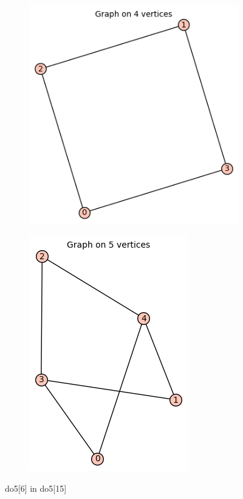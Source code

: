 \documentclass[12pt, a4paper]{article}
\begin{document}
\begin{center}
\begin{figure}
\centering
\begin{subfigure}{0.5\textwidth}
  \centering
  \includegraphics[width=0.6\linewidth]{do5[6]}
\end{subfigure}%
\begin{subfigure}{0.5\textwidth}
  \centering
  \includegraphics[width=0.5\linewidth]{do5[15]}
\end{subfigure}
\caption{do5[6] in do5[15]}
\label{fig:test}
\end{figure}


\end{center}
\end{document}
